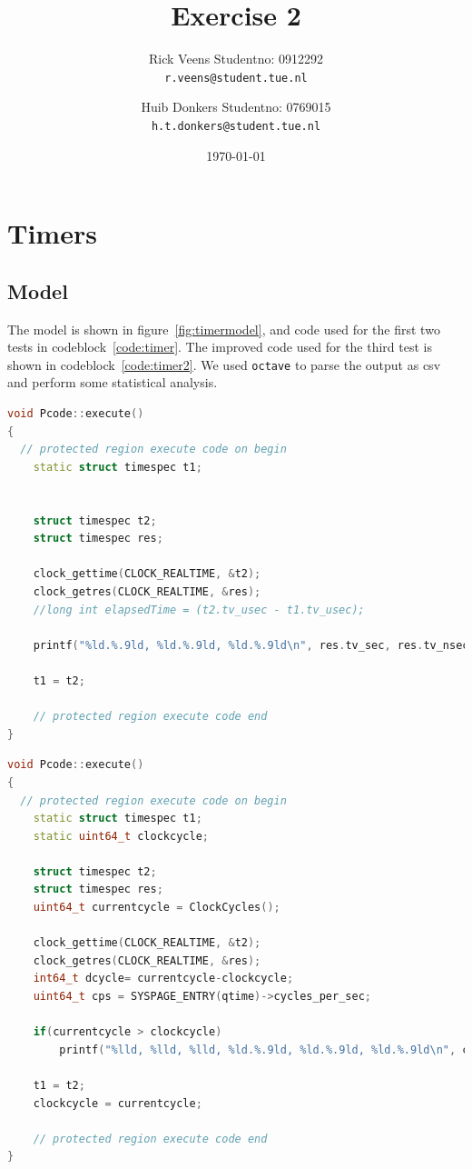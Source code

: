 \documentclass[a4paper,twoside,11pt]{article}
\title{\vspace{-\baselineskip}\sffamily\bfseries Exercise 2}
\author{
	Rick Veens \qquad Studentno: 0912292\\
	\texttt{r.veens@student.tue.nl}
	\and
	Huib Donkers \qquad Studentno: 0769015\\
	\texttt{h.t.donkers@student.tue.nl}
}
\date{\today}
\begin{document}
\maketitle

\section{Timers}
\subsection{Model}
The model is shown in figure~\ref{fig:timermodel}, and code used for the first two tests in codeblock~\ref{code:timer}. The improved code used for the third test is shown in codeblock~\ref{code:timer2}. We used \texttt{octave} to parse the output as csv and perform some statistical analysis.

\begin{lstlisting}[caption=Pcode::execute, label=code:timer, language=C++]
void Pcode::execute()
{
  // protected region execute code on begin
	static struct timespec t1;


	struct timespec t2;
	struct timespec res;

	clock_gettime(CLOCK_REALTIME, &t2);
	clock_getres(CLOCK_REALTIME, &res);
	//long int elapsedTime = (t2.tv_usec - t1.tv_usec);

	printf("%ld.%.9ld, %ld.%.9ld, %ld.%.9ld\n", res.tv_sec, res.tv_nsec, t2.tv_sec, t2.tv_nsec, t1.tv_sec, t1.tv_nsec);

	t1 = t2;

	// protected region execute code end
}
\end{lstlisting}
\begin{lstlisting}[caption=Pcode::execute (improved), label=code:timer2, language=C++]
void Pcode::execute()
{
  // protected region execute code on begin
	static struct timespec t1;
	static uint64_t clockcycle;

	struct timespec t2;
	struct timespec res;
	uint64_t currentcycle = ClockCycles();

	clock_gettime(CLOCK_REALTIME, &t2);
	clock_getres(CLOCK_REALTIME, &res);
	int64_t dcycle= currentcycle-clockcycle;
	uint64_t cps = SYSPAGE_ENTRY(qtime)->cycles_per_sec;

	if(currentcycle > clockcycle)
		printf("%lld, %lld, %lld, %ld.%.9ld, %ld.%.9ld, %ld.%.9ld\n", currentcycle, clockcycle, cps, res.tv_sec, res.tv_nsec, t2.tv_sec, t2.tv_nsec, t1.tv_sec, t1.tv_nsec);

	t1 = t2;
	clockcycle = currentcycle;

	// protected region execute code end
}
\end{lstlisting}
\end{document}

